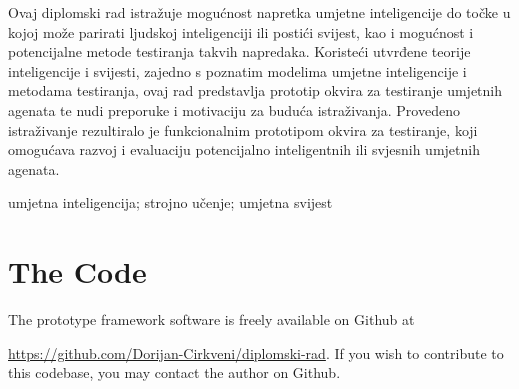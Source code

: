 \documentclass[masterthesis]{fer}
\begin{document}
\begin{sazetak}
  Ovaj diplomski rad istražuje mogućnost napretka umjetne inteligencije do točke u kojoj može parirati ljudskoj inteligenciji ili postići svijest, kao i mogućnost i potencijalne metode testiranja takvih napredaka. Koristeći utvrđene teorije inteligencije i svijesti, zajedno s poznatim modelima umjetne inteligencije i metodama testiranja, ovaj rad predstavlja prototip okvira za testiranje umjetnih agenata te nudi preporuke i motivaciju za buduća istraživanja. Provedeno istraživanje rezultiralo je funkcionalnim prototipom okvira za testiranje, koji omogućava razvoj i evaluaciju potencijalno inteligentnih ili svjesnih umjetnih agenata.
\end{sazetak}

\begin{kljucnerijeci}
  umjetna inteligencija; strojno učenje; umjetna svijest
\end{kljucnerijeci}




\backmatter

\chapter{The Code}

The prototype framework software is freely available on Github at

\href{https://github.com/Dorijan-Cirkveni/diplomski-rad}{https://github.com/Dorijan-Cirkveni/diplomski-rad}.
If you wish to contribute to this codebase, you may contact the author on Github.
\end{document}

